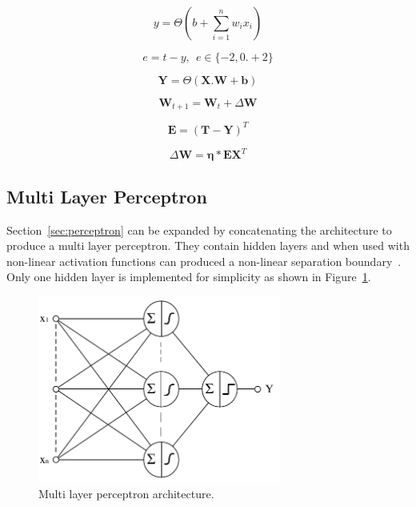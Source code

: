 \documentclass{ecsarticle}     %
\begin{document}
\begin{equation}
   y = \Theta \left(b + \sum_{i=1}^{n} w_i x_i \right)
   \label{eqn:slp}
\end{equation}

\begin{equation}	
	e = t - y,\:\:e \in \{-2,0.+2\}
	\label{eqn:slp_error}
\end{equation}

\begin{equation}
   \textbf{Y} = \Theta ( \textbf{X}.\textbf{W} + \textbf{b})
   \label{eqn:slp_mat}
\end{equation}

\begin{equation}	
	\textbf{W}_{t+1} = \textbf{W}_t + \Delta \textbf{W}
	\label{eqn:slp_learn_1}
\end{equation}

\begin{equation}	
	\mathbf{E} = (\mathbf{T} - \mathbf{Y})^{T}
	\label{eqn:slp_learn_2}
\end{equation}

\begin{equation}	
	\Delta \mathbf{W} = \mathbf{\eta}*\mathbf{E}\mathbf{X}^T
	\label{eqn:slp_learn_3}
\end{equation}


\subsection{Multi Layer Perceptron}
Section~\ref{sec:perceptron} can be expanded by concatenating the architecture to produce a multi layer perceptron.
They contain hidden layers and when used with non-linear activation functions can produced a non-linear separation boundary~\citep{bennett01ml}.
Only one hidden layer is implemented for simplicity as shown in Figure~\ref{fig:mlp}. 


\begin{figure}[ht]
   \centering
    \includegraphics[width = 8cm]{MLP.pdf}
   \caption{Multi layer perceptron architecture.}
   \label{fig:mlp}
\end{figure}
\end{document}

